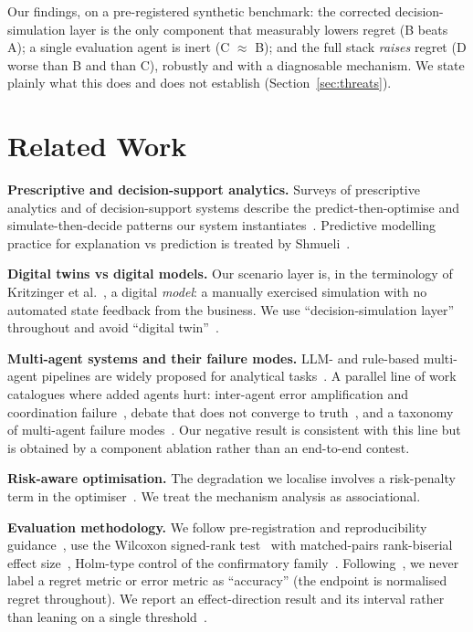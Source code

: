 \documentclass[10pt,twocolumn,a4paper]{article}
\begin{document}
Our findings, on a pre-registered synthetic benchmark: the corrected
decision-simulation layer is the only component that measurably lowers regret
(B beats A); a single evaluation agent is inert (C $\approx$ B); and the full
stack \emph{raises} regret (D worse than B and than C), robustly and with a
diagnosable mechanism. We state plainly what this does and does not establish
(Section~\ref{sec:threats}).

\section{Related Work}
\textbf{Prescriptive and decision-support analytics.} Surveys of prescriptive
analytics and of decision-support systems describe the predict-then-optimise and
simulate-then-decide patterns our system instantiates~\cite{Lepenioti2020,Arnott2014}.
Predictive modelling practice for explanation vs prediction is
treated by Shmueli~\cite{Shmueli2011}.

\textbf{Digital twins vs digital models.} Our scenario layer is, in the
terminology of Kritzinger et al.~\cite{Kritzinger2018}, a digital \emph{model}:
a manually exercised simulation with no automated state feedback from the
business. We use ``decision-simulation layer'' throughout and avoid ``digital
twin''~\cite{Grieves2017,Tao2019,Jones2020}.

\textbf{Multi-agent systems and their failure modes.} LLM- and rule-based
multi-agent pipelines are widely proposed for analytical
tasks~\cite{Du2023,Liang2024,Li2024,Zheng2023}. A parallel line of work
catalogues where added agents hurt: inter-agent error amplification and
coordination failure~\cite{Wang2024}, debate that does not converge to
truth~\cite{Smit2024,Huang2024}, and a taxonomy of multi-agent failure
modes~\cite{Cemri2025,Yang2024}. Our negative result is consistent with this
line but is obtained by a component ablation rather than an end-to-end contest.

\textbf{Risk-aware optimisation.} The degradation we localise involves a
risk-penalty term in the optimiser~\cite{Garcia2015}. We treat the mechanism
analysis as associational.

\textbf{Evaluation methodology.} We follow pre-registration and
reproducibility guidance~\cite{Nosek2018,Baker2016,Pineau2021}, use the Wilcoxon
signed-rank test~\cite{Wilcoxon1945} with matched-pairs rank-biserial effect
size~\cite{Kerby2014,Fritz2012}, Holm-type control of the confirmatory
family~\cite{Benjamini1995}. Following~\cite{Hyndman2006}, we never label a
regret metric or error metric as ``accuracy'' (the endpoint is normalised
regret throughout). We report an effect-direction result and its
interval rather than leaning on a single threshold~\cite{Wasserstein2016,Rosenthal1979}.
\end{document}
